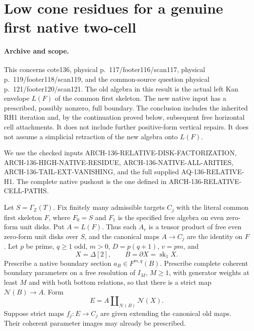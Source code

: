 \section{Low cone residues for a genuine first native two-cell}
\label{sec:136-first-cell-residues}

\paragraph{Archive and scope.}
This concerns cote136, physical p.~117/footer116/scan117,
physical p.~119/footer118/scan119, and the common-source question
physical p.~121/footer120/scan121. The old algebra in this result
is the actual left Kan envelope \(L(F)\) of the common first
skeleton. The new native input has a prescribed, possibly nonzero,
full boundary. The conclusion includes the inherited RH1 iteration
and, by the continuation proved below, subsequent free horizontal
cell attachments. It does not include further positive-form vertical
repairs. It does
not assume a simplicial retraction of the new algebra onto \(L(F)\).

We use the checked inputs ARCH-136-RELATIVE-DISK-FACTORIZATION,
ARCH-136-HIGH-NATIVE-RESIDUE, ARCH-136-NATIVE-ALL-ARITIES,
ARCH-136-TAIL-EXT-VANISHING, and the full supplied
AQ-136-RELATIVE-H1. The complete native pushout is the one
defined in ARCH-136-RELATIVE-CELL-PATHS.

Let \(S=\Gamma_{\mathbb Z}(T)\). Fix finitely many admissible
targets \(C_j\) with the literal common first skeleton \(F\),
where \(F_0=S\) and \(F_1\) is the specified free algebra
on even zero-form unit disks. Put \(A=L(F)\). Thus each
\(A_r\) is a tensor product of free even zero-form unit disks
over \(S\), and the canonical maps \(A\to C_j\) are the
identity on \(F\). Let \(p\) be prime, \(q\geq1\) odd,
\(m>0\), \(D=p(q+1)\), \(v=pm\), and
\[
                    X=\Delta[2],\qquad B=\partial X
                                      =\operatorname{sk}_1X.
                                                               \tag{136.FC1}
\]
Prescribe a native boundary section \(a_B\in F^{m,q}(B)\).
Prescribe complete coherent boundary parameters on a free
resolution of \(I_M\), \(M\geq1\), with generator weights
at least \(M\) and with both bottom relations, so that
there is a strict map \(\mathcal N(B)\to A\). Form
\[
                   E=A\amalg_{\mathcal N(B)}\mathcal N(X).
                                                               \tag{136.FC2}
\]
Suppose strict maps \(f_j:E\to C_j\) are given extending
the canonical old maps. Their coherent parameter images may
already be prescribed.

